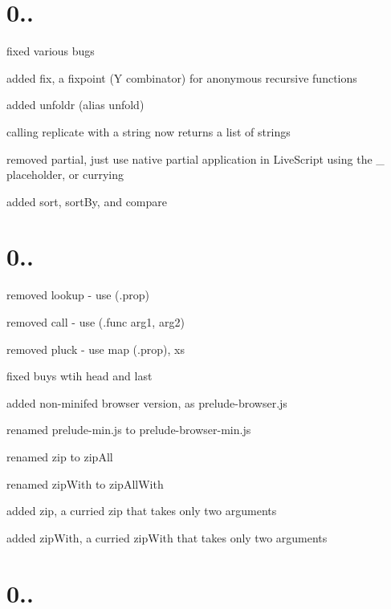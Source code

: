 \section*{0..}


\begin{DoxyItemize}
\item fixed various bugs
\item added {\ttfamily fix}, a fixpoint (Y combinator) for anonymous recursive functions
\item added {\ttfamily unfoldr} (alias {\ttfamily unfold})
\item calling {\ttfamily replicate} with a string now returns a list of strings
\item removed {\ttfamily partial}, just use native partial application in Live\+Script using the {\ttfamily \+\_\+} placeholder, or currying
\item added {\ttfamily sort}, {\ttfamily sort\+By}, and {\ttfamily compare}
\end{DoxyItemize}

\section*{0..}


\begin{DoxyItemize}
\item removed {\ttfamily lookup} -\/ use (.prop)
\item removed {\ttfamily call} -\/ use (.func arg1, arg2)
\item removed {\ttfamily pluck} -\/ use map (.prop), xs
\item fixed buys wtih {\ttfamily head} and {\ttfamily last}
\item added non-\/minifed browser version, as {\ttfamily prelude-\/browser.\+js}
\item renamed {\ttfamily prelude-\/min.\+js} to {\ttfamily prelude-\/browser-\/min.\+js}
\item renamed {\ttfamily zip} to {\ttfamily zip\+All}
\item renamed {\ttfamily zip\+With} to {\ttfamily zip\+All\+With}
\item added {\ttfamily zip}, a curried zip that takes only two arguments
\item added {\ttfamily zip\+With}, a curried zip\+With that takes only two arguments
\end{DoxyItemize}

\section*{0..}


